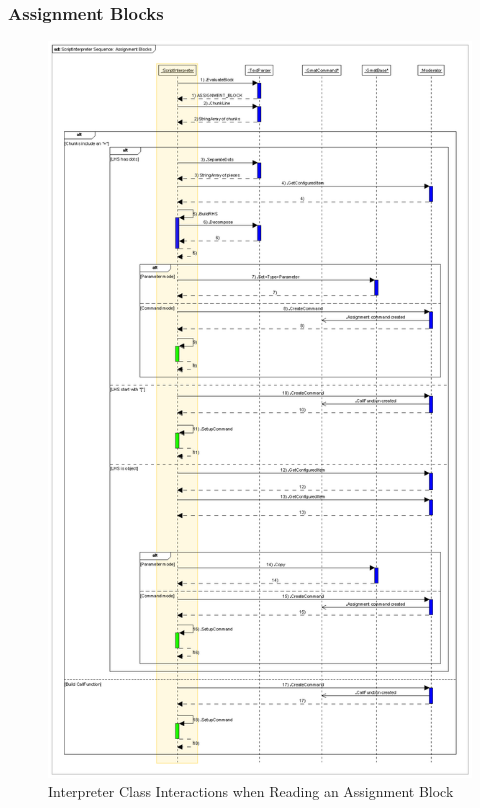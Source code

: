 \subsubsection{Assignment Blocks}

\begin{figure}
\begin{center}
\includegraphics[331,575]{Images/ScriptInterpreterSequenceAssignmentBlocks.png}
\caption{\label{figure:InterpreterReadInteractionsAssignmentBlock}Interpreter Class Interactions
when Reading an Assignment Block}
\end{center}
\end{figure}


